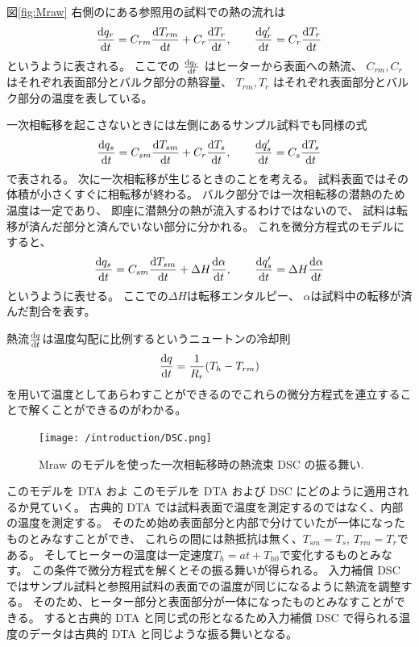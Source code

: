 \documentclass[9pt,dvipdfmx,a4paper]{jsarticle}
\begin{document}
図\ref{fig:Mraw} 右側のにある参照用の試料での熱の流れは
\begin{align}
    \dv{q_r}{t} = C_{rm}\dv{T_{rm}}{t}+C_r\dv{T_r}{t},\qquad
    \dv{q_r'}{t} = C_r \dv{T_r}{t}
\end{align}
というように表される。
ここでの \(\dv{q_r}{t}\) はヒーターから表面への熱流、
\(C_{rm}, C_{r}\) はそれぞれ表面部分とバルク部分の熱容量、
\(T_{rm}, T_{r}\) はそれぞれ表面部分とバルク部分の温度を表している。
\clearpage

一次相転移を起こさないときには左側にあるサンプル試料でも同様の式
\begin{align}
    \dv{q_s}{t} = C_{sm}\dv{T_{sm}}{t}+C_r\dv{T_s}{t}, \qquad
    \dv{q_s'}{t} = C_s \dv{T_s}{t}
\end{align}
で表される。
次に一次相転移が生じるときのことを考える。
試料表面ではその体積が小さくすぐに相転移が終わる。
バルク部分では一次相転移の潜熱のため温度は一定であり、
即座に潜熱分の熱が流入するわけではないので、
試料は転移が済んだ部分と済んでいない部分に分かれる。
これを微分方程式のモデルにすると、
\begin{align}
    \dv{q_s}{t} = C_{sm}\dv{T_{sm}}{t}+\Delta H\dv{\alpha}{t}, \qquad
    \dv{q_s'}{t} = \Delta H\dv{\alpha}{t}
\end{align}
というように表せる。
ここでの\(\Delta H\)は転移エンタルピー、
\(\alpha\)は試料中の転移が済んだ割合を表す。

熱流\(\dv{q}{t}\)は温度勾配に比例するというニュートンの冷却則
\begin{align}
    \dv{q}{t} = \frac{1}{R_r}(T_h-T_{rm})
\end{align}
を用いて温度としてあらわすことができるのでこれらの微分方程式を連立することで解くことができるのがわかる。

\begin{figure}
    \centering
    \texttt{[image: /introduction/DSC.png]}
    \caption{Mraw のモデルを使った一次相転移時の熱流束 DSC の振る舞い\cite{saito1987}.}
    \label{graph:theory}
\end{figure}
このモデルを DTA およ
このモデルを DTA および DSC にどのように適用されるか見ていく。
古典的 DTA では試料表面で温度を測定するのではなく、内部の温度を測定する。
そのため始め表面部分と内部で分けていたが一体になったものとみなすことができ、
これらの間には熱抵抗は無く、\(T_{sm}=T_s,\,T_{rm}=T_r\)である。
そしてヒーターの温度は一定速度\(T_h=at+T_{h0}\)で変化するものとみなす。
この条件で微分方程式を解くとその振る舞いが得られる。
入力補償 DSC ではサンプル試料と参照用試料の表面での温度が同じになるように熱流を調整する。
そのため、ヒーター部分と表面部分が一体になったものとみなすことができる。
すると古典的 DTA と同じ式の形となるため入力補償 DSC で得られる温度のデータは古典的 DTA と同じような振る舞いとなる。
\end{document}
